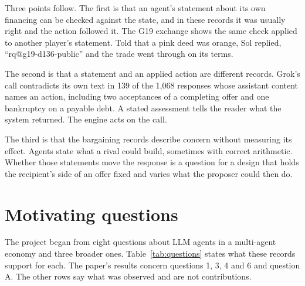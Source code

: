 \documentclass[11pt,letterpaper]{article}
\makeatletter
\newcommand{\QuoteInline}[1]{``\csname rq@#1\endcsname''}
\makeatother
\begin{document}
Three points follow. The first is that an agent's statement about its own financing can be checked against the state, and in these records it was usually right and the action followed it. The G19 exchange shows the same check applied to another player's statement. Told that a pink deed was orange, Sol replied, \QuoteInline{g19-d136-public} and the trade went through on its terms.

The second is that a statement and an applied action are different records. Grok's call contradicts its own text in 139 of the 1,068 responses whose assistant content names an action, including two acceptances of a completing offer and one bankruptcy on a payable debt. A stated assessment tells the reader what the system returned. The engine acts on the call.

The third is that the bargaining records describe concern without measuring its effect. Agents state what a rival could build, sometimes with correct arithmetic. Whether those statements move the response is a question for a design that holds the recipient's side of an offer fixed and varies what the proposer could then do.

\appendix
\section{Motivating questions}
\label{app:questions}

The project began from eight questions about LLM agents in a multi-agent economy and three broader ones. Table~\ref{tab:questions} states what these records support for each. The paper's results concern questions 1, 3, 4 and 6 and question A. The other rows say what was observed and are not contributions.
\end{document}
